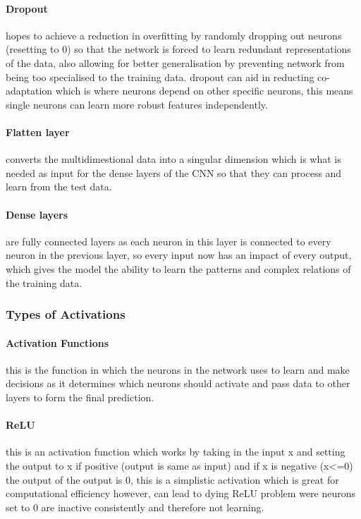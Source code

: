 \documentclass[]{final_report}
\begin{document}
\paragraph{Dropout} 
hopes to achieve a reduction in overfitting by randomly dropping out neurons (resetting to 0) so that the network is forced to learn redundant representations of the data, also allowing for better generalisation by preventing network from being too specialised to the training data. dropout can aid in reducting co-adaptation which is where neurons depend on other specific neurons, this means single neurons can learn more robust features independently. 

\paragraph{Flatten layer}
converts the multidimestional data into a singular dimension which is what is needed as input for the dense layers of the CNN so that they can process and learn from the test data.

\paragraph{Dense layers}
are fully connected layers as each neuron in this layer is connected to every neuron in the previous layer, so every input now has an impact of every output, which gives the model the ability to learn the patterns and complex relations of the training data.

\subsubsection{Types of Activations}

\paragraph{Activation Functions}
this is the function in which the neurons in the network uses to learn and make decisions as it determines which neurons should activate and pass data to other layers to form the final prediction.

\paragraph{ReLU}
this is an activation function which works by taking in the input x and setting the output to x if positive (output is same as input) and if x is negative (x<=0) the output of the output is 0, this is a simplistic activation which is great for computational efficiency however, can lead to dying ReLU problem were neurons set to 0 are inactive consistently and therefore not learning.
\end{document}
